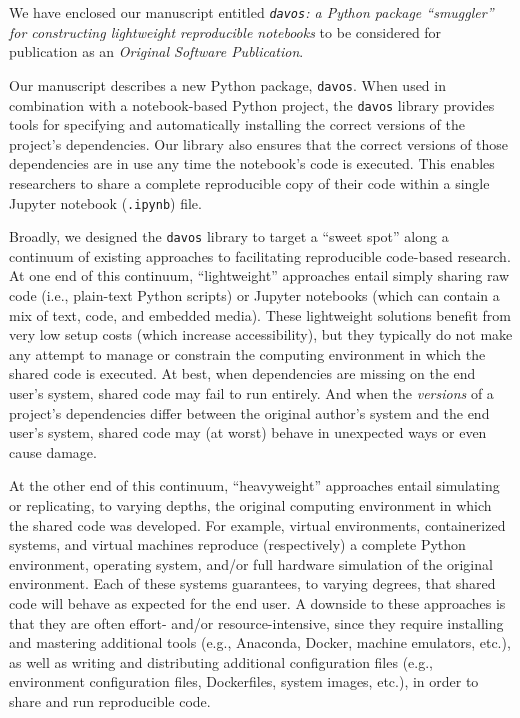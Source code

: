 \documentclass[11pt,stdletter,orderfromtodate,sigleft]{newlfm}
\begin{document}
\begin{newlfm}

  We have enclosed our manuscript entitled \textit{\texttt{davos}: a
    Python package ``smuggler'' for constructing lightweight
    reproducible notebooks} to be considered for publication as
  an \textit{Original Software Publication}.

  Our manuscript describes a new Python package, \texttt{davos}.  When
  used in combination with a notebook-based Python project, the
  \texttt{davos} library provides tools for specifying and
  automatically installing the correct versions of the project's
  dependencies.  Our library also ensures that the correct versions of
  those dependencies are in use any time the notebook's code is
  executed.  This enables researchers to share a complete reproducible
  copy of their code within a single Jupyter notebook (\texttt{.ipynb}) file.

  Broadly, we designed the \texttt{davos} library to target a ``sweet
  spot'' along a continuum of existing approaches to facilitating reproducible
  code-based research.  At one end of this continuum, ``lightweight''
  approaches entail simply sharing raw code (i.e., plain-text Python
  scripts) or Jupyter notebooks (which can contain a mix
  of text, code, and embedded media).  These lightweight solutions
  benefit from very low setup costs (which increase accessibility),
  but they typically do not make any attempt to manage or constrain
  the computing environment in which the shared code is executed.
  At best, when dependencies are missing on the end user's system, shared code
 may fail to run entirely.  And when the \textit{versions} of a
 project's dependencies differ between the original author's system and
 the end user's system, shared code may (at worst) behave in
 unexpected ways or even cause damage.

 At the other end of this continuum, ``heavyweight'' approaches entail
 simulating or replicating, to varying depths, the original computing
 environment in which the shared code was developed.  For example,
 virtual environments, containerized systems, and virtual machines
 reproduce (respectively) a complete Python environment, operating system, and/or
 full hardware simulation of the original environment.  Each of these
 systems guarantees, to varying degrees, that shared code will behave
 as expected for the end user.  A downside to these approaches is that
 they are often effort- and/or resource-intensive, since they require
 installing and mastering additional tools (e.g., Anaconda, Docker, machine
 emulators, etc.), as well as writing and distributing additional
 configuration files (e.g., environment configuration files,
 Dockerfiles, system images, etc.), in order to share and run reproducible code.


\end{newlfm}
\end{document}
